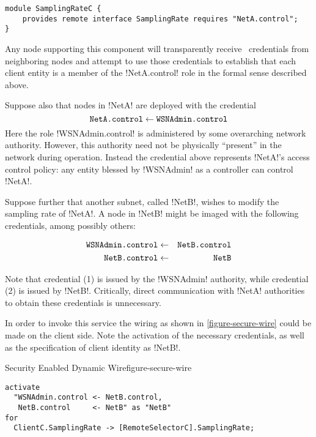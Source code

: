 \singlespace
\begin{lstlisting}
module SamplingRateC {
    provides remote interface SamplingRate requires "NetA.control";
}
\end{lstlisting}
\primaryspacing

Any node supporting this component will transparently receive \RT\ credentials from neighboring
nodes and attempt to use those credentials to establish that each client entity is a member of
the !NetA.control! role in the formal sense described above.

Suppose also that nodes in !NetA! are deployed with the credential
\begin{displaymath}
\texttt{NetA.control} \leftarrow \texttt{WSNAdmin.control}
\end{displaymath}
Here the role !WSNAdmin.control! is administered by some overarching network authority. However,
this authority need not be physically ``present'' in the network during operation. Instead the
credential above represents !NetA!'s access control policy: any entity blessed by !WSNAdmin! as
a controller can control !NetA!.

Suppose further that another subnet, called !NetB!, wishes to modify the sampling rate of
!NetA!. A node in !NetB! might be imaged with the following credentials, among possibly others:

\singlespace
\begin{eqnarray}
\texttt{WSNAdmin.control} & \leftarrow & \texttt{NetB.control} \\
\texttt{NetB.control}     & \leftarrow & \texttt{NetB}
\end{eqnarray}
\primaryspacing

Note that credential (1) is issued by the !WSNAdmin! authority, while credential (2) is issued
by !NetB!. Critically, direct communication with !NetA! authorities to obtain these credentials
is unnecessary.

In order to invoke this service the wiring as shown in \autoref{figure-secure-wire} could be
made on the client side. Note the activation of the necessary credentials, as well as the
specification of client identity as !NetB!.

\begin{fpfig}[t]{Security Enabled Dynamic Wire}{figure-secure-wire}
{
\singlespace
\begin{lstlisting}
activate
  "WSNAdmin.control <- NetB.control, 
   NetB.control     <- NetB" as "NetB"
for 
  ClientC.SamplingRate -> [RemoteSelectorC].SamplingRate;
\end{lstlisting}
\primaryspacing
}
\end{fpfig}

